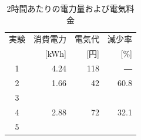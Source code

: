 \documentclass[a4j,fleqn,dvipdfmx,uplatex]{jsarticle}
\begin{document}
\begin{table}[htb]
  \caption{2時間あたりの電力量および電気料金}
  \label{table:electric_bill}
  \centering
  \begin{tabular}{crrr}
    実験 & 消費電力 & 電気代 & 減少率 \\[-1.5mm]
     & \small [kWh] & \small [円] &  \small [\%] \\
    \hline \hline
    1 & 4.24 & 118 & ― \\
    2 & 1.66 & 42 & 60.8 \\
    3 &  &  &  \\
    4 & 2.88 & 72 & 32.1 \\
    5 &  &  &  \\
    \hline
  \end{tabular}
\end{table}
\end{document}

